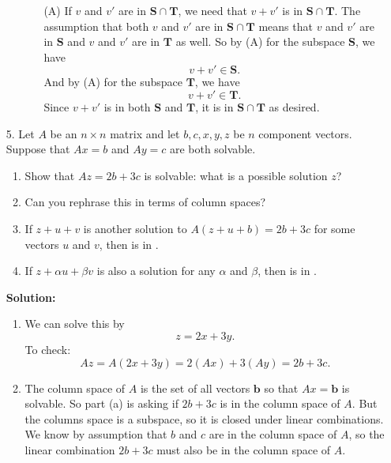 \documentclass[11pt]{article}
\begin{document}
\begin{enumerate}
\begin{enumerate}
\begin{enumerate}
\item[(A)] If $v$ and $v'$ are in $\mathbf{S} \cap \mathbf{T}$, we need that 
$v + v'$ is in $\mathbf{S} \cap \mathbf{T}$.  The assumption that both $v$ and $v'$ are in $\mathbf{S} \cap \mathbf{T}$ means that $v$ and $v'$ are in $\mathbf{S}$ and $v$ and $v'$ are in $\mathbf{T}$ as well.  So by (A) for the subspace $\mathbf{S}$, we have
\[v + v' \in \mathbf{S}. \]
And by (A) for the subspace $\mathbf{T}$, we have
\[v + v' \in \mathbf{T}.\]
Since $v + v'$ is in both $\mathbf{S}$ and $\mathbf{T}$, it is in $\mathbf{S} \cap \mathbf{T}$ as desired.

\end{enumerate}

\end{enumerate}

\item[5.] Let $A$ be an $n \times n$ matrix and let $b,c,x,y,z$ be $n$ component vectors.  Suppose that $Ax=b$ and $Ay=c$ are both solvable.  

\begin{enumerate}

\item Show that $Az=2b+3c$ is solvable: what is a possible solution $z$?  
\item Can you rephrase this in terms of column spaces?
\item If $z+u+v$ is another solution to $A(z+u+b)=2b+3c$ for some vectors $u$ and $v$, then \underline{\phantom{aaaaaaaaaaaa}} is in \underline{\phantom{aaaaaaaaaaaa}}.
\item If $z+\alpha u+\beta v$ is also a solution for any $\alpha$ and $\beta$, then \underline{\phantom{aaaaaaaaaaaa}} is in \underline{\phantom{aaaaaaaaaaaa}}.
\end{enumerate}

\textbf{Solution:} 

\begin{enumerate}

\item We can solve this by
\[z = 2x + 3y.\]
To check:
\[Az = A(2x + 3y) = 2(Ax) + 3(Ay) = 2b + 3c.\]
\item The column space of $A$ is the set of all vectors $\mathbf{b}$ so that $Ax = \mathbf{b}$ is solvable.  So part (a) is asking if $2b + 3c$ is in the column space of $A$.  But the columns space is a subspace, so it is closed under linear combinations.  We know by assumption that $b$ and $c$ are in the column space of $A$, so the linear combination $2b + 3c$ must also be in the column space of $A$.


\end{enumerate}
\end{enumerate}
\end{document}
